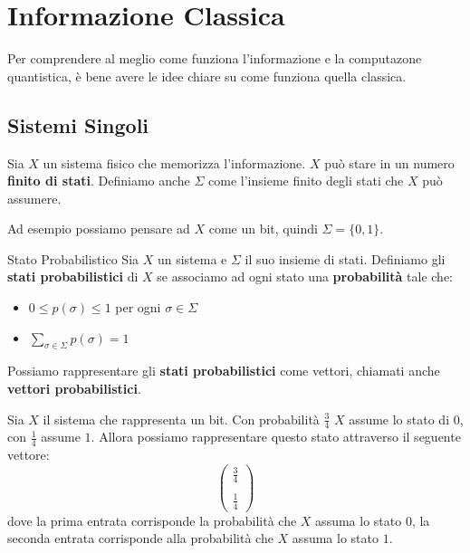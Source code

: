 \section{Informazione Classica}
Per comprendere al meglio come funziona l'informazione e la computazone quantistica, è bene avere le idee chiare su come funziona quella classica.
\subsection{Sistemi Singoli}
Sia $X$ un sistema fisico che memorizza l'informazione. $X$ può stare in un numero \textbf{finito di stati}. Definiamo anche $\Sigma$ come l'insieme finito degli stati che $X$ può assumere.

\begin{example}{}{}
    Ad esempio possiamo pensare ad $X$ come un bit, quindi $\Sigma = \{0,1\}$.
\end{example}

\begin{definition}{Stato Probabilistico}{}
    Sia $X$ un sistema e $\Sigma$ il suo insieme di stati. Definiamo gli \textbf{stati probabilistici} di $X$ se associamo ad ogni stato una \textbf{probabilità} tale che:
    \begin{itemize}
        \item $0 \leq p(\sigma) \leq 1$ per ogni $\sigma \in \Sigma$
        \item $\sum_{\sigma \in \Sigma} p(\sigma) = 1$
    \end{itemize}
\end{definition}

Possiamo rappresentare gli \textbf{stati probabilistici} come vettori, chiamati anche \textbf{vettori probabilistici}.
\begin{example}{}{}
    Sia $X$ il sistema che rappresenta un bit. Con probabilità $\frac{3}{4}$ $X$ assume lo stato di $0$, con $\frac{1}{4}$ assume $1$. Allora possiamo rappresentare questo stato attraverso il seguente vettore:
    \begin{equation*}
         \left(\begin{array}{c}
             \frac{3}{4}  \\ \\
             \frac{1}{4} 
        \end{array}\right)
    \end{equation*}
    dove la prima entrata corrisponde la probabilità che $X$ assuma lo stato $0$, la seconda entrata corrisponde alla probabilità che $X$ assuma lo stato $1$.

\end{example}

